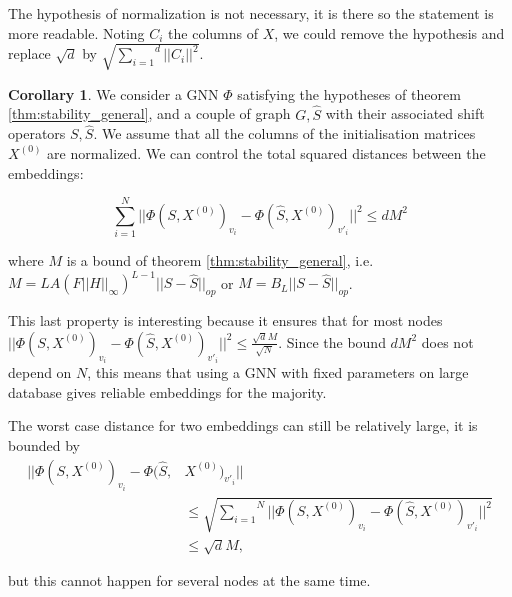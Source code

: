 \documentclass[11pt,a4paper]{article}
\newcommand{\op}[1]{|| #1 ||_{op}}
\newcommand{\ninf}[1]{|| #1 ||_\infty}
\newcommand{\Sum}[2]{\overset{#2}{\underset{#1}{\sum}}}
\theoremstyle{definition}
\newtheorem{corollary}{Corollary}[theorem]
\renewcommand{\leq}{\leqslant}
\begin{document}
     The hypothesis of normalization is not necessary, it is there so the statement is more readable. Noting $C_i$ the columns of $X$, we could remove the hypothesis and replace $\sqrt{d}$ by $\sqrt{\Sum{i=1}{d} || C_i||^2 }$.


    \begin{corollary}
    \label{cor:global_node_stability}
    We consider a GNN $\Phi$ satisfying the hypotheses of theorem \ref{thm:stability_general}, and a couple of graph $G,\hat{S}$ with their associated shift operators $S,\hat{S}$. We assume that all the columns of the initialisation matrices $X^{(0)}$ are normalized. We can control the total squared distances between the embeddings:
    
    \begin{equation}
        \Sum{i=1}{N} || \Phi(S, X^{(0)})_{v_i} - \Phi(\hat{S}, X ^{(0)})_{v'_i} ||^2 \leq d M^2
        \label{eq:global_node_stab}
    \end{equation}

    where $M$ is a bound of theorem \ref{thm:stability_general}, i.e. $ M = L A (F \ninf{H})^{L-1} \op{S - \hat{S}}$ or $M=B_L \op{S - \hat{S}}$.

    \end{corollary}

        This last property is interesting because it ensures that for most nodes $ || \Phi(S, X^{(0)})_{v_i} - \Phi(\hat{S}, X ^{(0)})_{v'_i} ||^2 \leq \frac{\sqrt{d} M}{\sqrt{N}}$. Since the bound $d M^2$ does not depend on $N$, this means that using a GNN with fixed parameters on large database gives reliable embeddings for the majority.

        The worst case distance for two embeddings can still be relatively large, it is bounded by 
        \begin{align*}
            || \Phi(S, X^{(0)})_{v_i} - \Phi(\hat{S}, &X ^{(0)})_{v'_i} || \\
            &\leq \sqrt{\Sum{i=1}{N} || \Phi(S, X^{(0)})_{v_i} - \Phi(\hat{S}, X ^{(0)})_{v'_i} ||^2} \\
            &\leq \sqrt{d}M,
        \end{align*} 

        but this cannot happen for several nodes at the same time.
\end{document}
